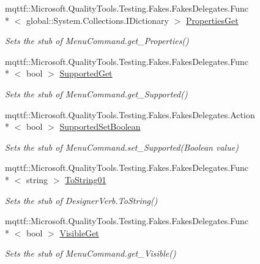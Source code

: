 \begin{DoxyCompactItemize}
mqttf\-::\-Microsoft.\-Quality\-Tools.\-Testing.\-Fakes.\-Fakes\-Delegates.\-Func\\*
$<$ global\-::\-System.\-Collections.\-I\-Dictionary $>$ \hyperlink{class_system_1_1_component_model_1_1_design_1_1_fakes_1_1_stub_designer_verb_a3b68711e67dd874aade9ef8eb9aa0236}{Properties\-Get}
\begin{DoxyCompactList}\small\item\em Sets the stub of Menu\-Command.\-get\-\_\-\-Properties()\end{DoxyCompactList}\item 
mqttf\-::\-Microsoft.\-Quality\-Tools.\-Testing.\-Fakes.\-Fakes\-Delegates.\-Func\\*
$<$ bool $>$ \hyperlink{class_system_1_1_component_model_1_1_design_1_1_fakes_1_1_stub_designer_verb_a5b187ddf86986c37d685cbd4b90d01c0}{Supported\-Get}
\begin{DoxyCompactList}\small\item\em Sets the stub of Menu\-Command.\-get\-\_\-\-Supported()\end{DoxyCompactList}\item 
mqttf\-::\-Microsoft.\-Quality\-Tools.\-Testing.\-Fakes.\-Fakes\-Delegates.\-Action\\*
$<$ bool $>$ \hyperlink{class_system_1_1_component_model_1_1_design_1_1_fakes_1_1_stub_designer_verb_a167044114007b762adc67a0148474255}{Supported\-Set\-Boolean}
\begin{DoxyCompactList}\small\item\em Sets the stub of Menu\-Command.\-set\-\_\-\-Supported(\-Boolean value)\end{DoxyCompactList}\item 
mqttf\-::\-Microsoft.\-Quality\-Tools.\-Testing.\-Fakes.\-Fakes\-Delegates.\-Func\\*
$<$ string $>$ \hyperlink{class_system_1_1_component_model_1_1_design_1_1_fakes_1_1_stub_designer_verb_a45207a598445b3d570170ffe9a478b44}{To\-String01}
\begin{DoxyCompactList}\small\item\em Sets the stub of Designer\-Verb.\-To\-String()\end{DoxyCompactList}\item 
mqttf\-::\-Microsoft.\-Quality\-Tools.\-Testing.\-Fakes.\-Fakes\-Delegates.\-Func\\*
$<$ bool $>$ \hyperlink{class_system_1_1_component_model_1_1_design_1_1_fakes_1_1_stub_designer_verb_a9a54a9a98959dad066e703fc82d52706}{Visible\-Get}
\begin{DoxyCompactList}\small\item\em Sets the stub of Menu\-Command.\-get\-\_\-\-Visible()\end{DoxyCompactList}\item 

\end{DoxyCompactItemize}

